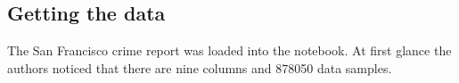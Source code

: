 \documentclass[../Main.tex]{subfiles}
\begin{document}
\subsection{Getting the data}
The San Francisco crime report was loaded into the notebook. At first glance the authors noticed that there are nine columns and 878050 data samples.
\end{document}
